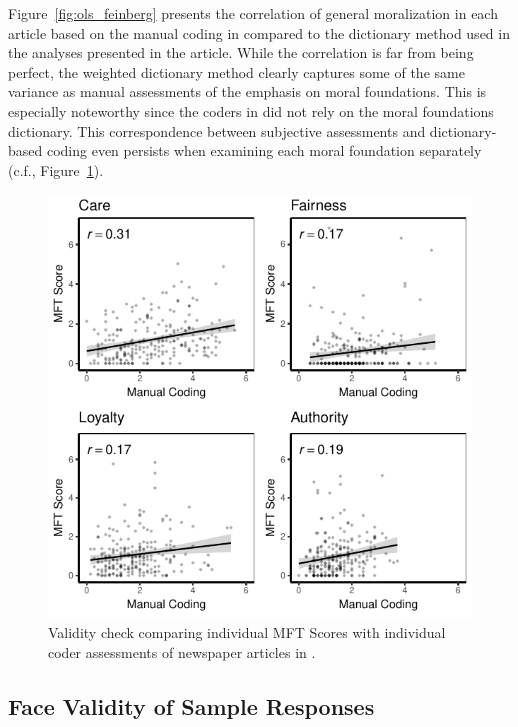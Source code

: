\documentclass[12pt]{article}
\begin{document}
Figure~\ref{fig:ols_feinberg} presents the correlation of general moralization in each article based on the manual coding in \citet{feinberg2013moral} compared to the dictionary method used in the analyses presented in the article. While the correlation is far from being perfect, the weighted dictionary method clearly captures some of the same variance as manual assessments of the emphasis on moral foundations. This is especially noteworthy since the coders in \citet{feinberg2013moral} did not rely on the moral foundations dictionary. This correspondence between subjective assessments and dictionary-based coding even persists when examining each moral foundation separately (c.f., Figure~\ref{fig:ols_feinberg_sep}).


\begin{figure}[ht]\centering
\includegraphics{../calc/fig/feinberg_sep.pdf}
\caption{Validity check comparing individual MFT Scores with individual coder assessments of newspaper articles in \citet{feinberg2013moral}.}\label{fig:ols_feinberg_sep}
\end{figure}



\clearpage

\subsection{Face Validity of Sample Responses}
\end{document}
